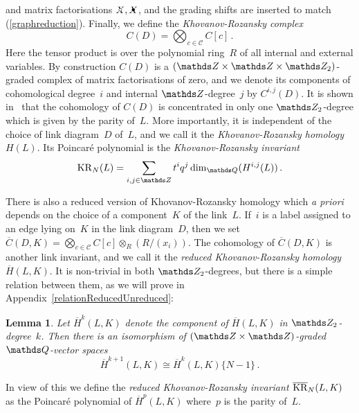 \documentclass{compositio}
\newtheorem{lemma}[theorem]{Lemma}
\theoremstyle{definition}
\numberwithin{equation}{section}
\begin{document}
\begin{minipage}{0.48cm}     
\end{minipage} 
and matrix factorisations $\Xcirc, \Xbul$, and the grading shifts are inserted to match (\ref{graphreduction}). Finally, we define the \emph{Khovanov-Rozansky complex}
$$
C(D) = \bigotimes_{c\in\mathcal C} C[c] \, .
$$
Here the tensor product is over the polynomial ring~$R$ of all internal and external variables. By construction $C(D)$ is a $(\nZ\times\nZ\times\nZ_{2})$-graded complex of matrix factorisations of zero, and we denote its components of cohomological degree~$i$ and internal $\nZ$-degree~$j$ by $C^{i,j}(D)$. It is shown in~\cite{kr0401268} that the cohomology of $C(D)$ is concentrated in only one $\nZ_{2}$-degree which is given by the parity of~$L$. More importantly, it is independent of the choice of link diagram~$D$ of~$L$, and we call it the \emph{Khovanov-Rozansky homology $H(L)$}. Its Poincar\'e polynomial is the \emph{Khovanov-Rozansky invariant}
$$
\KR_{N}(L) = \sum_{i,j\in\nZ} t^{i} q^j \dim_{\nQ}(H^{i,j}(L)) \, . 
$$

There is also a reduced version of Khovanov-Rozansky homology which \emph{a priori} depends on the choice of a component~$K$ of the link~$L$. If~$i$ is a label assigned to an edge lying on~$K$ in the link diagram~$D$, then we set $\overline{C}(D,K)=\bigotimes_{c\in\mathcal C} C[c] \otimes_{R}(R/(x_{i}))$. The cohomology of $\overline{C}(D,K)$ is another link invariant, and we call it the \emph{reduced Khovanov-Rozansky homology $\overline{H}(L,K)$}. It is non-trivial in both $\nZ_{2}$-degrees, but there is a simple relation between them, as we will prove in Appendix~\ref{relationReducedUnreduced}: 
\begin{lemma}
\label{Z2gradingReduced}
Let $\overline{H}^k(L,K)$ denote the component of $\overline{H}(L,K)$ in $\nZ_{2}$-degree~$k$. Then there is an isomorphism of $(\nZ\times\nZ)$-graded $\nQ$-vector spaces 
$$
\overline{H}^{k+1}(L,K) \cong \overline{H}^k(L,K)\{N-1\} \, .
$$
\end{lemma}
In view of this we define the \emph{reduced Khovanov-Rozansky invariant $\overline{\operatorname{KR}}_{N}(L,K)$} as the Poincar\'e polynomial of $\overline{H}^p(L,K)$ where~$p$ is the parity of~$L$. 
\end{document}
